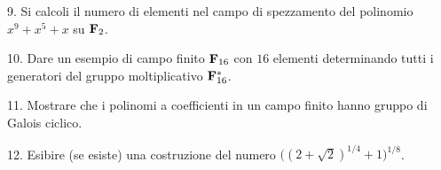 \item{9.} Si calcoli il numero di elementi nel campo di spezzamento
del polinomio
$x^9+x^5+x$ su ${\bf F}_2$.\vv %

\item{10.} Dare un esempio di campo finito ${\bf F}_{16}$ con $16$
elementi determinando tutti i generatori del gruppo moltiplicativo
${\bf F}_{16}^*$.%
\ve\ \vs

\item{11.} Mostrare che i polinomi a coefficienti in un campo finito hanno
gruppo di Galois ciclico.\vss

\item{12.} Esibire (se esiste) una costruzione del numero
$\big((2+\sqrt{2})^{1/4}+1\big)^{1/8}$.\vv %
\ \vst

 \bye
